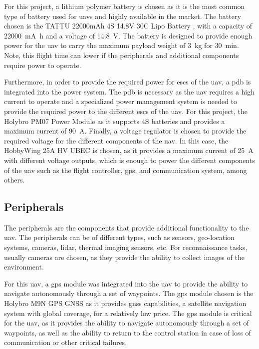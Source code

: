 For this project, a lithium polymer battery is chosen as it is the most common type of battery used for \glspl{uav} and highly available in the market. The battery chosen is the TATTU 22000mAh 4S 14.8V 30C Lipo Battery \autocite{rcinnovationsComprarBatera}, with a capacity of \SI{22000}{\milli\ampere\hour} and a voltage of \SI{14.8}{\volt}. The battery is designed to provide enough power for the \gls{uav} to carry the maximum payload weight of \SI{3}{\kilo\gram} for \SI{30}{\minute}. Note, this flight time can lower if the peripherals and additional components require power to operate.

Furthermore, in order to provide the required power for \glspl{esc} of the \gls{uav}, a \gls{pdb} is integrated into the power system. The \gls{pdb} is necessary as the \gls{uav} requires a high current to operate and a specialized power management system is needed to provide the required power to the different \glspl{esc} of the \gls{uav}. For this project, the  Holybro PM07 Power Module \autocite{rcinnovationsHolybroPM07} as it supports 4S batteries and provides a maximum current of \SI{90}{\ampere}. Finally, a voltage regulator is chosen to provide the required voltage for the different components of the \gls{uav}. In this case, the HobbyWing 25A HV UBEC \autocite{rcinnovationsHobbyWingUbec} is chosen, as it provides a maximum current of \SI{25}{\ampere} with different voltage outputs, which is enough to power the different components of the \gls{uav} such as the flight controller, \gls{gps}, and communication system, among others.

\subsection{Peripherals}

The peripherals are the components that provide additional functionality to the \gls{uav}. The peripherals can be of different types, such as sensors, geo-location systems, cameras, lidar, thermal imaging sensors, etc. For reconnaissance tasks, usually cameras are chosen, as they provide the ability to collect images of the environment.

For this \gls{uav}, a \gls{gps} module was integrated into the \gls{uav} to provide the ability to navigate autonomously through a set of waypoints. The \gls{gps} module chosen is the Holybro M9N GPS GNSS \autocite{rcinnovationsHolybroGNSS} as it provides \gls{gnss} capabilities, a satellite navigation system with global coverage, for a relatively low price. The \gls{gps} module is critical for the \gls{uav}, as it provides the ability to navigate autonomously through a set of waypoints, as well as the ability to return to the control station in case of loss of communication or other critical failures.

